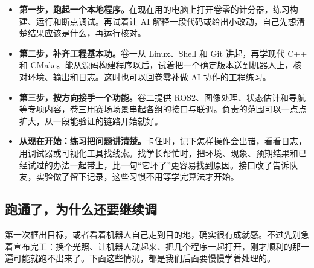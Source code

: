 \begin{itemize}
    \item \textbf{第一步，跑起一个本地程序。}在现在用的电脑上打开卷零的计分器，练习构建、运行和断点调试。再试着让 AI 解释一段代码或给出小改动，自己先想清楚结果应该是什么，再运行核对。
    \item \textbf{第二步，补齐工程基本功。}卷一从 Linux、Shell 和 Git 讲起，再学现代 C++ 和 CMake。能从源码构建程序以后，试着把一个确定版本送到机器人上，核对环境、输出和日志。这时也可以回卷零补做 AI 协作的工程练习。
    \item \textbf{第三步，按方向接手一个功能。}卷二提供 ROS2、图像处理、状态估计和导航等专项内容，卷三用赛场场景串起各组的接口与联调。负责的范围可以一点点扩大，从一段能验证的链路开始就好。
    \item \textbf{从现在开始：练习把问题讲清楚。}卡住时，记下怎样操作会出错，看看日志，用调试器或可视化工具找线索。找学长帮忙时，把环境、现象、预期结果和已经试过的办法一起带上，比一句“它坏了”更容易找到原因。接口改了告诉队友，实验做了留下记录，这些习惯不用等学完算法才开始。
\end{itemize}

\subsection*{跑通了，为什么还要继续调}
第一次框出目标，或者看着机器人自己走到目的地，确实很有成就感。不过先别急着宣布完工：换个光照、让机器人动起来、把几个程序一起打开，刚才顺利的那一遍可能就跑不出来了。下面这些情况，都是我们后面要慢慢学着处理的。

